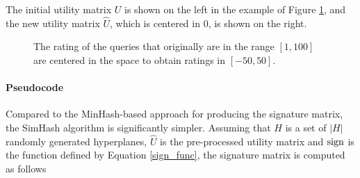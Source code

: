 The initial utility matrix $U$ is shown on the left in the example of Figure \ref{fig:standardization}, and the new utility matrix $\widehat{U}$, which is centered in $0$, is shown on the right. 



\begin{figure}[h]
    \begin{minipage}{0.49\linewidth}
        \centering
    \end{minipage}
    \begin{minipage}{0.49\linewidth}
        \centering
    \end{minipage}
    \caption{\normalfont The rating of the queries that originally are in the range $[1,100]$ are centered in the space to obtain ratings in $[-50,50]$.} 
    \label{fig:standardization}
\end{figure}


\paragraph{Pseudocode} Compared to the MinHash-based approach for producing the signature matrix, the SimHash algorithm is significantly simpler. Assuming that $H$ is a set of $|H|$ randomly generated hyperplanes, $\widehat{U}$ is the pre-processed utility matrix and $\operatorname{sign}$ is the function defined by Equation \ref{sign_func}, the signature matrix is computed as follows



